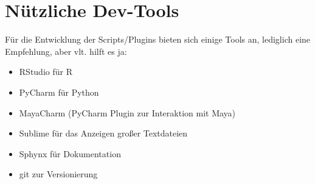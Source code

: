 \documentclass[a4paper, openany, oneside]{memoir}
\begin{document}
\section{Nützliche Dev-Tools}
Für die Entwicklung der Scripts/Plugins bieten sich einige Tools an, lediglich eine Empfehlung, aber vlt. hilft es ja:
\begin{itemize}
\item RStudio für R
\item PyCharm für Python
\item MayaCharm (PyCharm Plugin zur Interaktion mit Maya)
\item Sublime für das Anzeigen großer Textdateien
\item Sphynx für Dokumentation
\item git zur Versionierung
\end{itemize}
\end{document}
